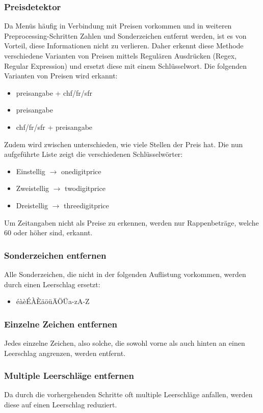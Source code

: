 \subsubsection{Preisdetektor}
Da Menüs häufig in Verbindung mit Preisen vorkommen und in weiteren Preprocessing-Schritten Zahlen und Sonderzeichen entfernt werden, ist es von Vorteil, diese Informationen nicht zu verlieren.
Daher erkennt diese Methode verschiedene Varianten von Preisen mittels Regulären Ausdrücken (Regex, Regular Expression) und ersetzt diese mit einem Schlüsselwort.
Die folgenden Varianten von Preisen wird erkannt:
\begin{itemize}
	\item preisangabe + chf/fr/sfr
	\item preisangabe
	\item chf/fr/sfr + preisangabe
\end{itemize} 
Zudem wird zwischen unterschieden, wie viele Stellen der Preis hat.
Die nun aufgeführte Liste zeigt die verschiedenen Schlüsselwörter:
\begin{itemize}
	\item Einstellig $\rightarrow$ onedigitprice
	\item Zweistellig $\rightarrow$ twodigitprice
	\item Dreistellig $\rightarrow$ threedigitprice
\end{itemize} 
Um Zeitangaben nicht als Preise zu erkennen, werden nur Rappenbeträge, welche 60 oder höher sind, erkannt.
\subsubsection{Sonderzeichen entfernen}
Alle Sonderzeichen, die nicht in der folgenden Auflistung vorkommen, werden durch einen Leerschlag ersetzt:
\begin{itemize}
	\item éàèÉÀÈäöüÄÖÜa-zA-Z
\end{itemize} 
\subsubsection{Einzelne Zeichen entfernen}
Jedes einzelne Zeichen, also solche, die sowohl vorne als auch hinten an einen Leerschlag angrenzen, werden entfernt.
\subsubsection{Multiple Leerschläge entfernen}
Da durch die vorhergehenden Schritte oft multiple Leerschläge anfallen, werden diese auf einen Leerschlag reduziert.
